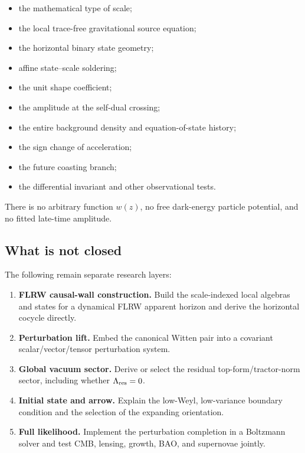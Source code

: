 \documentclass[
  11pt,
  letterpaper,
]{article}
\providecommand{\tightlist}{%
  \setlength{\itemsep}{0pt}\setlength{\parskip}{0pt}}
\begin{document}
\begin{itemize}
\tightlist
\item
  the mathematical type of scale;
\item
  the local trace-free gravitational source equation;
\item
  the horizontal binary state geometry;
\item
  affine state--scale soldering;
\item
  the unit shape coefficient;
\item
  the amplitude at the self-dual crossing;
\item
  the entire background density and equation-of-state history;
\item
  the sign change of acceleration;
\item
  the future coasting branch;
\item
  the differential invariant and other observational tests.
\end{itemize}

There is no arbitrary function \(w(z)\), no free dark-energy particle
potential, and no fitted late-time amplitude.

\subsection{What is not closed}\label{what-is-not-closed}

The following remain separate research layers:

\begin{enumerate}
\def\labelenumi{\arabic{enumi}.}
\tightlist
\item
  \textbf{FLRW causal-wall construction.} Build the scale-indexed local
  algebras and states for a dynamical FLRW apparent horizon and derive
  the horizontal cocycle directly.
\item
  \textbf{Perturbation lift.} Embed the canonical Witten pair into a
  covariant scalar/vector/tensor perturbation system.
\item
  \textbf{Global vacuum sector.} Derive or select the residual
  top-form/tractor-norm sector, including whether
  \(\Lambda_{\rm res}=0\).
\item
  \textbf{Initial state and arrow.} Explain the low-Weyl, low-variance
  boundary condition and the selection of the expanding orientation.
\item
  \textbf{Full likelihood.} Implement the perturbation completion in a
  Boltzmann solver and test CMB, lensing, growth, BAO, and supernovae
  jointly.
\end{enumerate}
\end{document}
